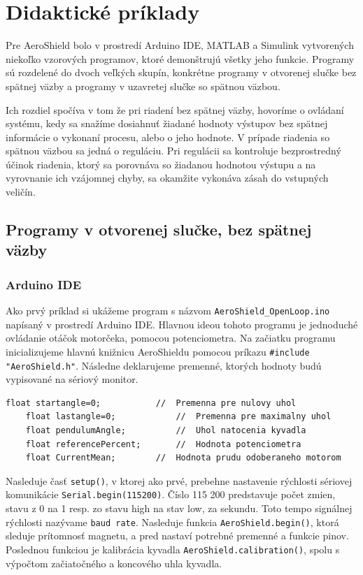 \chapter{Didaktické príklady}
\label{Didaktické príklady}

Pre AeroShield bolo v prostredí Arduino IDE, MATLAB a Simulink vytvorených niekoľko vzorových programov, ktoré demonštrujú všetky jeho funkcie. Programy sú rozdelené do dvoch veľkých skupín, konkrétne programy v otvorenej slučke bez spätnej väzby a programy v uzavretej slučke so spätnou väzbou. 

Ich rozdiel spočíva v tom že pri riadení bez spätnej väzby, hovoríme o ovládaní systému, kedy sa snažíme dosiahnuť žiadané hodnoty výstupov bez spätnej informácie o vykonaní procesu, alebo o jeho hodnote. V prípade riadenia so spätnou väzbou sa jedná o reguláciu. Pri regulácii sa kontroluje bezprostredný účinok riadenia, ktorý sa porovnáva so žiadanou hodnotou výstupu a na vyrovnanie ich vzájomnej chyby, sa okamžite vykonáva zásah do vstupných veličín. 

\section{Programy v otvorenej slučke, bez spätnej väzby}
\subsection{Arduino IDE}

Ako prvý príklad si ukážeme program s názvom \verb|AeroShield_OpenLoop.ino| napísaný v prostredí Arduino IDE. Hlavnou ideou tohoto programu je jednoduché ovládanie otáčok motorčeka, pomocou potenciometra. Na začiatku programu inicializujeme hlavnú knižnicu AeroShieldu pomocou príkazu \verb|#include "AeroShield.h"|. Následne deklarujeme premenné, ktorých hodnoty budú vypisované na sériový monitor. 

\begin{lstlisting}[caption={AeroShield open loop dekleracia.},captionpos=b]
	float startangle=0;           //  Premenna pre nulovy uhol
	float lastangle=0;            //  Premenna pre maximalny uhol 
	float pendulumAngle;          //  Uhol natocenia kyvadla
	float referencePercent;       //  Hodnota potenciometra
	float CurrentMean;	      //  Hodnota prudu odoberaneho motorom 
\end{lstlisting}

Nasleduje časť \verb|setup()|, v ktorej ako prvé, prebehne nastavenie rýchlosti sériovej komunikácie \verb|Serial.begin(115200)|. Číslo 115 200 predstavuje počet zmien, stavu z 0 na 1 resp. zo stavu high na stav low, za sekundu. Toto tempo signálnej rýchlosti nazývame \verb|baud rate|. Nasleduje funkcia \verb|AeroShield.begin()|, ktorá sleduje prítomnosť magnetu, a pred nastaví potrebné premenné a funkcie pinov. Poslednou funkciou je kalibrácia kyvadla \verb|AeroShield.calibration()|, spolu s výpočtom začiatočného a koncového uhla kyvadla. 

